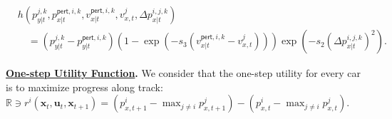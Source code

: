 \begin{align*}
&h(p_{y|t}^{j,k}, p_{x|t}^{\textsf{pert},i,k},v_{x|t}^{\textsf{pert},i,k},v_{x,t}^{j},\Delta p_{x|t}^{i,j,k}) \\ &\quad = (p_{y|t}^{j,k} - p_{y|t}^{\textsf{pert},i,k})(1-\exp(-s_3(v_{x|t}^{\textsf{pert},i,k}- v_{x,t}^{j})))\exp(-s_2(\Delta p_{x|t}^{i,j,k})^2).
\end{align*} 



\noindent 
\textbf{\underline{One-step Utility Function}.} 
We consider that the one-step utility for every car is to maximize progress along track: \(
\mathbb{R}\ni r^i(\mathbf{x}_t,\mathbf{u}_t,\mathbf{x}_{t+1}) = (p_{x,t+1}^{i} - \max_{j\neq i} p_{x,t+1}^{j})- (p_{x,t}^{i} - \max_{j\neq i} p_{x,t}^{j}). \)